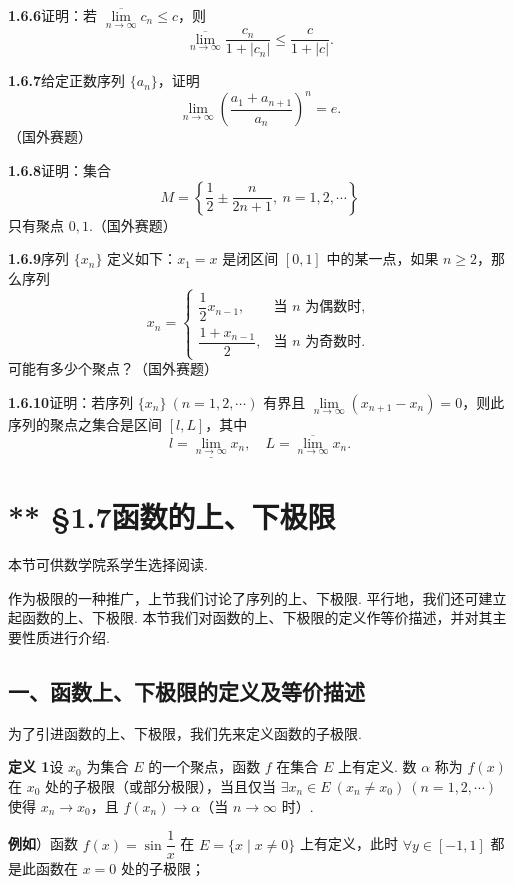\documentclass[UTF8,12pt,a4paper,fontset=fandol]{ctexart}
\begin{document}
\noindent\textbf{1.6.6}\quad 证明：若 $\overline{\lim\limits_{n\to\infty}}c_n\le c$，则
\[
  \overline{\lim_{n\to\infty}}\frac{c_n}{1+|c_n|}
  \le \frac{c}{1+|c|}.
\]

\noindent\textbf{1.6.7}\quad 给定正数序列 $\{a_n\}$，证明
\[
  \lim_{n\to\infty}\left(\frac{a_1+a_{n+1}}{a_n}\right)^n=e.
\]
（国外赛题）

\noindent\textbf{1.6.8}\quad 证明：集合
\[
  M=\left\{\frac12\pm\frac{n}{2n+1},\ n=1,2,\cdots\right\}
\]
只有聚点 $0,1$.（国外赛题）

\noindent\textbf{1.6.9}\quad 序列 $\{x_n\}$ 定义如下：$x_1=x$ 是闭区间 $[0,1]$ 中的某一点，如果 $n\ge2$，那么序列
\[
  x_n=
  \begin{cases}
    \dfrac12x_{n-1}, & \text{当 }n\text{ 为偶数时},\\[1mm]
    \dfrac{1+x_{n-1}}2, & \text{当 }n\text{ 为奇数时}.
  \end{cases}
\]
可能有多少个聚点？（国外赛题）

\noindent\textbf{1.6.10}\quad 证明：若序列 $\{x_n\}\ (n=1,2,\cdots)$ 有界且 $\lim\limits_{n\to\infty}(x_{n+1}-x_n)=0$，则此序列的聚点之集合是区间 $[l,L]$，其中
\[
  l=\underline{\lim_{n\to\infty}}x_n,\quad L=\overline{\lim_{n\to\infty}}x_n.
\]

\section*{** §1.7\quad 函数的上、下极限}

本节可供数学院系学生选择阅读.

作为极限的一种推广，上节我们讨论了序列的上、下极限. 平行地，我们还可建立起函数的上、下极限. 本节我们对函数的上、下极限的定义作等价描述，并对其主要性质进行介绍.

\subsection*{一、函数上、下极限的定义及等价描述}

为了引进函数的上、下极限，我们先来定义函数的子极限.

\noindent\textbf{定义 1}\quad 设 $x_0$ 为集合 $E$ 的一个聚点，函数 $f$ 在集合 $E$ 上有定义. 数 $\alpha$ 称为 $f(x)$ 在 $x_0$ 处的子极限（或部分极限），当且仅当 $\exists x_n\in E\ (x_n\ne x_0)\ (n=1,2,\cdots)$ 使得 $x_n\to x_0$，且 $f(x_n)\to\alpha$（当 $n\to\infty$ 时）.

\noindent\textbf{例如}）函数 $f(x)=\sin\dfrac1x$ 在 $E=\{x\mid x\ne0\}$ 上有定义，此时 $\forall y\in[-1,1]$ 都是此函数在 $x=0$ 处的子极限；
\end{document}
